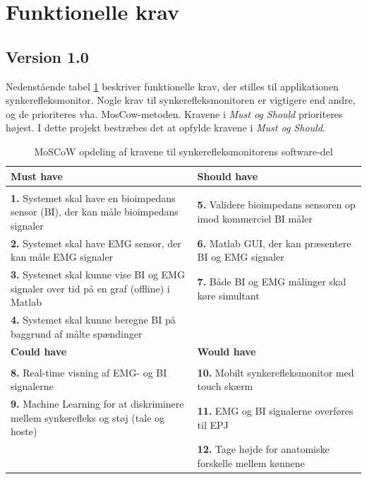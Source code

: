 \pagebreak
\section{Funktionelle krav}
\subsection{Version 1.0}
Nedenstående tabel \ref{tab:moscow} beskriver funktionelle krav, der stilles til applikationen synkerefleksmonitor. Nogle krav til synkerefleksmonitoren er vigtigere end andre, og de prioriteres vha. MosCow-metoden. Kravene i\textit{ Must og Should} prioriteres højest. I dette projekt bestræbes det at opfylde kravene i \textit{ Must og Should}. 

\begin{table}[H]

\begin{tabularx}{\textwidth}{X|X}
\rowcolor{Gray}
\toprule
\textbf{Must have} & \textbf{Should have} \\
\hline \\
\textbf{1. }Systemet skal have en bioimpedans sensor (BI), der kan måle bioimpedans signaler & \textbf{5. }Validere bioimpedans sensoren op imod kommerciel BI måler \\[5ex]
\textbf{2. }Systemet skal have EMG sensor, der kan måle EMG signaler & \textbf{6. }Matlab GUI, der kan præsentere BI og EMG signaler \\[3ex]
\textbf{3. }Systemet skal kunne vise BI og EMG signaler over tid på en graf (offline) i Matlab  & \textbf{7. }Både BI og EMG målinger skal køre simultant\\[4ex]
\textbf{4. }Systemet skal kunne beregne BI på baggrund af målte spændinger & \\[4ex]


\midrule
    \rowcolor{Gray}
    \textbf{Could have} & \textbf{Would have}\\
    \midrule \\
\textbf{8. }Real-time visning af EMG- og BI signalerne & \textbf{10. }Mobilt synkerefleksmonitor med touch skærm\\[4ex]
\textbf{9. }Machine Learning for at diskriminere mellem synkerefleks og støj (tale og hoste)& \textbf{11. }EMG og BI signalerne overføres til EPJ  \\[4ex]
& \textbf{12. }Tage højde for anatomiske forskelle mellem kønnene\\[4ex]

\end{tabularx}

\caption{MoSCoW opdeling af kravene til  synkerefleksmonitorens software-del}
  \label{tab:moscow}
\end{table}

